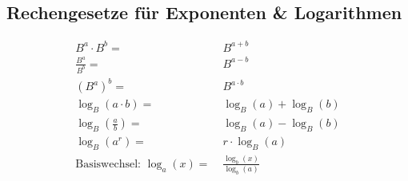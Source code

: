 \subsection{Rechengesetze für Exponenten \& Logarithmen}
\vspace*{-1em}
    \begin{align*}
        B^a \cdot B^b =& \; B^{a + b}\\
        \frac{B^a}{B^b} =& \; B^{a - b}\\
        (B^a)^b =& \; B^{a \cdot b}\\
        \log_B (a \cdot b ) =& \; \log_B (a) + \log_B (b)\\
        \log_B \left( \frac{a}{b} \right) =& \; \log_B (a) - \log_B (b)\\
        \log_B (a^r) =& \; r \cdot \log_B (a)\\
        \textrm{Basiswechsel: } \log_a (x) =& \; \frac{\log_b(x)}{\log_b(a)}
    \end{align*}